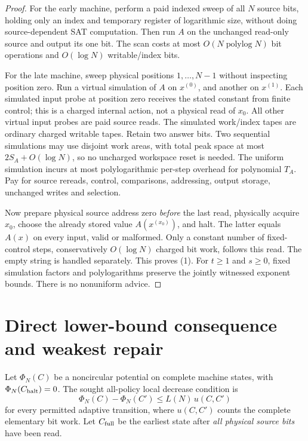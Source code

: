 \documentclass[11pt]{article}
\begin{document}
\begin{proof}
For the early machine, perform a paid indexed sweep of all
$N$ source bits, holding only an index and temporary
register of logarithmic size, without doing source-dependent
SAT computation. Then run $A$ on the unchanged read-only
source and output its one bit. The scan costs at most
$O(N\operatorname{polylog}N)$ bit operations and $O(\log N)$
writable/index bits.

For the late machine, sweep physical positions
$1,\ldots,N-1$ without inspecting position zero.
Run a virtual simulation of $A$ on $x^{(0)}$, and another on
$x^{(1)}$. Each simulated input probe at position zero
receives the stated constant from finite control; this
is a charged internal action, not a physical read of $x_0$.
All other virtual input probes are paid source reads.
The simulated work/index tapes are ordinary charged
writable tapes. Retain two answer bits. Two sequential
simulations may use disjoint work areas, with total
peak space at most $2S_A+O(\log N)$, so no uncharged
workspace reset is needed. The uniform simulation incurs
at most polylogarithmic per-step overhead for polynomial
$T_A$. Pay for source rereads, control, comparisons,
addressing, output storage, unchanged writes and selection.

Now prepare physical source address zero \emph{before} the
last read, physically acquire $x_0$, choose the already
stored value $A(x^{(x_0)})$, and halt. The latter equals
$A(x)$ on every input, valid or malformed. Only a constant
number of fixed-control steps, conservatively $O(\log N)$
charged bit work, follows this read. The empty string is
handled separately. This proves (1). For $t\ge1$ and
$s\ge0$, fixed simulation factors and polylogarithms
preserve the jointly witnessed exponent bounds.
There is no nonuniform advice.
\end{proof}

\section{Direct lower-bound consequence and weakest repair}
Let $\Phi_N(C)$ be a noncircular potential on complete
machine states, with $\Phi_N(C_{\rm halt})=0$. The sought
all-policy local decrease condition is
\[
\Phi_N(C)-\Phi_N(C')
\le L(N)\,u(C,C') \tag{2}
\]
for every permitted adaptive transition, where
$u(C,C')$ counts the complete elementary bit work.
Let $C_{\rm full}$ be the earliest state after
\emph{all physical source bits} have been read.
\end{document}
